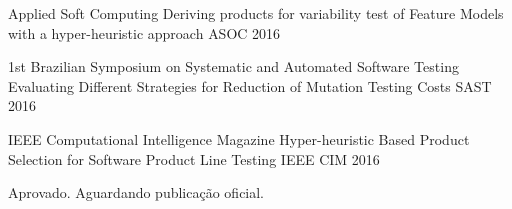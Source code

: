 

\begin{cventries}

\cventry
	{Applied Soft Computing} %
	{Deriving products for variability test of Feature Models with a hyper-heuristic approach} %
	{ASOC} %
	{2016} %
	{
	}

  \cventry
    {1st Brazilian Symposium on Systematic and Automated Software Testing} %
    {Evaluating Different Strategies for Reduction of Mutation Testing Costs} %
    {SAST} %
    {2016} %
    {
    }

  \cventry
    {IEEE Computational Intelligence Magazine} %
    {Hyper-heuristic Based Product Selection for Software Product Line Testing} %
    {IEEE CIM} %
    {2016} %
    {
      \begin{cvitems} %
        \item {Aprovado. Aguardando publicação oficial.}
      \end{cvitems}
    }

\end{cventries}
